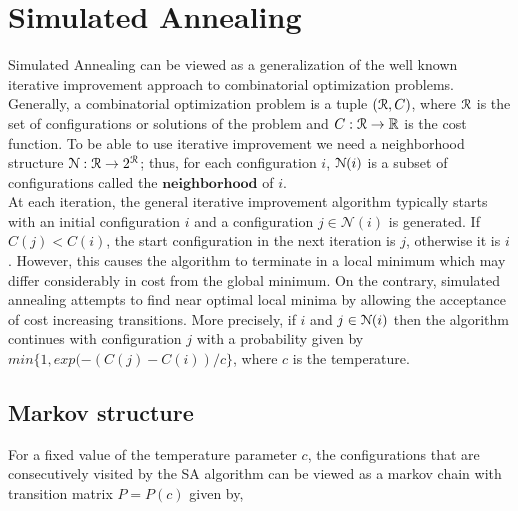 \documentclass[letterpaper,english,10pt]{article}
\begin{document}
\section{Simulated Annealing}
Simulated Annealing can be viewed as a generalization of the well known iterative improvement approach to combinatorial optimization problems. Generally, a combinatorial optimization problem is a tuple $(\mathcal{R},C)$, where $\mathcal{R}$ is the set of configurations or solutions of the problem and $C:  \mathcal{R} \rightarrow \mathbb{R} $ is the cost function. To be able to use iterative improvement we need a neighborhood structure $\mathcal{N}: \mathcal{R} \rightarrow 2^{\mathcal{R}}$; thus, for each configuration $i$, $\mathcal{N}(i)$ is a subset of configurations called the $\textbf{neighborhood}$ of $i$.\\ 

At each iteration, the general iterative improvement algorithm typically starts with an initial configuration $i$ and a configuration $j \in \mathcal{N}(i)$ is generated. If $C(j) < C(i)$, the start configuration in the next iteration is $j$, otherwise it is $i$. However, this causes the algorithm to terminate in a local minimum which may differ considerably in cost from the global minimum.
On the contrary, simulated annealing attempts to find near optimal local minima by allowing the acceptance of cost increasing transitions. More precisely, if $i$ and $j \in \mathcal{N}(i)$ then the algorithm continues with configuration $j$ with a probability given by $min\{1, exp(-(C(j) -C(i))/c\}$, where $c$ is the temperature.

\subsection{Markov structure}
For a fixed value of the temperature parameter $c$, the configurations that are consecutively visited by the SA algorithm can be viewed as a markov chain with transition matrix $P = P(c)$ given by,
\end{document}
